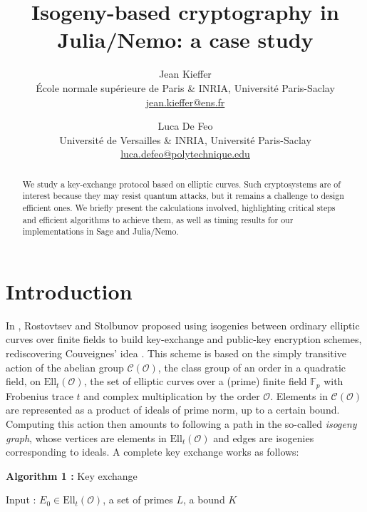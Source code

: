 \documentclass[12pt]{article}
\newcommand{\F}{\mathbb{F}}
\renewcommand{\O}{\mathcal{O}}
\newcommand{\Ell}{\mathrm{Ell}}
\newcommand{\Cl}{\mathcal{C}}
\begin{document}
\title{Isogeny-based cryptography in Julia/Nemo: a case study}

\author{Jean Kieffer \\
\'Ecole normale sup\'erieure de Paris \& INRIA, Universit\'e Paris-Saclay \\
\url{jean.kieffer@ens.fr}
\and
Luca De Feo \\
Universit\'e de Versailles \& INRIA, Universit\'e Paris-Saclay \\
\url{luca.defeo@polytechnique.edu}}

\maketitle

\begin{abstract}
We study a key-exchange protocol based on elliptic curves. Such cryptosystems are of interest because they may resist quantum attacks, but it remains a challenge to design efficient ones. We briefly present the calculations involved, highlighting critical steps and efficient algorithms to achieve them, as well as timing results for our implementations in Sage and Julia/Nemo.
\end{abstract}

\section{Introduction}

In \cite{RS}, Rostovtsev and Stolbunov proposed using isogenies between ordinary elliptic curves over finite fields to build key-exchange and public-key encryption schemes, rediscovering Couveignes' idea \cite{Couveignes}. This scheme is based on the simply transitive action of the abelian group $\Cl(\O)$, the class group of an order in a quadratic field, on $\Ell_t(\O)$, the set of elliptic curves over a (prime) finite field $\F_p$ with Frobenius trace $t$ and complex multiplication by the order $\O$. Elements in $\Cl(\O)$ are represented as a product of ideals of prime norm, up to a certain bound. Computing this action then amounts to following a path in the so-called \emph{isogeny graph}, whose vertices are elements in $\Ell_t(\O)$ and edges are isogenies corresponding to ideals. A complete key exchange works as follows:

\vspace{2mm}
\textbf{Algorithm 1 :} Key exchange

\noindent
Input : $E_0\in \Ell_t(\O)$, a set of primes $L$, a bound $K$
\end{document}
